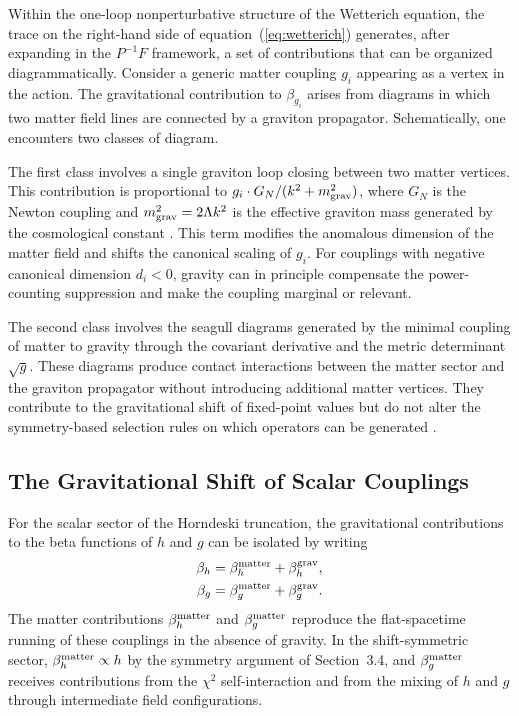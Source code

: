 \documentclass[12pt,a4paper]{article}
\begin{document}
Within the one-loop nonperturbative structure of the Wetterich equation, the
trace on the right-hand side of equation~(\ref{eq:wetterich}) generates, after
expanding in the $P^{-1}F$ framework, a set of contributions that can be
organized diagrammatically. Consider a generic matter coupling $g_i$ appearing
as a vertex in the action. The gravitational contribution to $\beta_{g_i}$ arises
from diagrams in which two matter field lines are connected by a graviton
propagator. Schematically, one encounters two classes of diagram.

The first class involves a single graviton loop closing between two matter
vertices. This contribution is proportional to $g_i \cdot G_N / (k^2 + m_{\rm grav}^2)$,
where $G_N$ is the Newton coupling and $m_{\rm grav}^2 = 2\Lambda k^2$ is the
effective graviton mass generated by the cosmological constant \cite{Percacci2017,
ReuterSaueressig2012}. This term modifies the anomalous dimension of the matter
field and shifts the canonical scaling of $g_i$. For couplings with negative
canonical dimension $d_i < 0$, gravity can in principle compensate the
power-counting suppression and make the coupling marginal or relevant.

The second class involves the seagull diagrams generated by the minimal coupling
of matter to gravity through the covariant derivative and the metric determinant
$\sqrt{g}$. These diagrams produce contact interactions between the matter
sector and the graviton propagator without introducing additional matter vertices.
They contribute to the gravitational shift of fixed-point values but do not
alter the symmetry-based selection rules on which operators can be generated
\cite{EichhornSchiffer2022handbook}.

\subsection{The Gravitational Shift of Scalar Couplings}

For the scalar sector of the Horndeski truncation, the gravitational contributions
to the beta functions of $h$ and $g$ can be isolated by writing
\begin{align}
\beta_h &= \beta_h^{\rm matter} + \beta_h^{\rm grav}, \\
\beta_g &= \beta_g^{\rm matter} + \beta_g^{\rm grav}.
\end{align}
The matter contributions $\beta_h^{\rm matter}$ and $\beta_g^{\rm matter}$
reproduce the flat-spacetime running of these couplings in the absence of
gravity. In the shift-symmetric sector, $\beta_h^{\rm matter} \propto h$
by the symmetry argument of Section~3.4, and $\beta_g^{\rm matter}$ receives
contributions from the $\chi^2$ self-interaction and from the mixing of $h$
and $g$ through intermediate field configurations.
\end{document}
